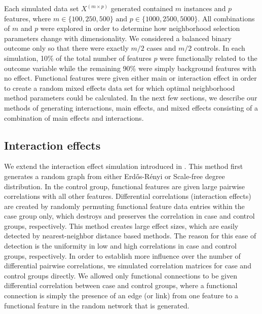 \documentclass[10pt,letterpaper]{article}\usepackage[]{graphicx}\usepackage[]{color}
\begin{document}
Each simulated data set $X^{(m \times p)}$ generated contained $m$ instances and $p$ features, where $m \in \{100, 250, 500\} \text{ and } p \in \{1000,2500,5000\}$. All combinations of $m$ and $p$ were explored in order to determine how neighborhood selection parameters change with dimensionality. We considered a balanced binary outcome only so that there were exactly $m/2$ cases and $m/2$ controls. In each simulation, 10\% of the total number of features $p$ were functionally related to the outcome variable while the remaining 90\% were simply background features with no effect. Functional features were given either main or interaction effect in order to create a random mixed effects data set for which optimal neighborhood method parameters could be calculated. In the next few sections, we describe our methods of generating interactions, main effects, and mixed effects consisting of a combination of main effects and interactions.

\subsection{Interaction effects}

We extend the interaction effect simulation introduced in \cite{lareau15}. This method first generates a random graph from either Erd\H{o}s-R\'{e}nyi or Scale-free degree distribution. In the control group, functional features are given large pairwise correlations with all other features. Differential correlations (interaction effects) are created by randomly permuting functional feature data entries within the case group only, which destroys and preserves the correlation in case and control groups, respectively. This method creates large effect sizes, which are easily detected by nearest-neighbor distance based methods. The reason for this ease of detection is the uniformity in low and high correlations in case and control groups, respectively. In order to establish more influence over the number of differential pairwise correlations, we simulated correlation matrices for case and control groups directly. We allowed only functional connections to be given differential correlation between case and control groups, where a functional connection is simply the presence of an edge (or link) from one feature to a functional feature in the random network that is generated.
\end{document}
